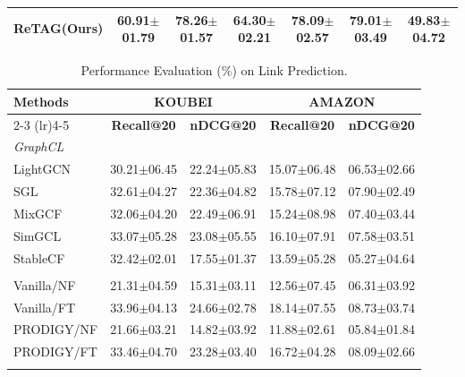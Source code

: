 \begin{table}[ht]
{\begin{tabular}{lcccccc}
\textbf{ReTAG(Ours)} & \textbf{60.91}$\pm$01.79  & \textbf{78.26}$\pm$01.57  & \textbf{64.30}$\pm$02.21  & 
\textbf{78.09}$\pm$02.57  & \textbf{79.01}$\pm$03.49  & \textbf{49.83}$\pm$04.72\\
\bottomrule
\end{tabular}
}

\label{tab:static-results}
\end{table}
\begin{table}[t]
\centering
\caption{Performance Evaluation (\%) on Link Prediction.}
\label{tab:dynamic-results}

\footnotesize
\setlength{\tabcolsep}{3.2pt}
\renewcommand{\arraystretch}{0.92}

\begin{tabular}{lcccc}
\toprule
\multirow{2}{*}{\textbf{Methods}}  
 & \multicolumn{2}{c}{\textbf{KOUBEI}} 
 & \multicolumn{2}{c}{\textbf{AMAZON}} \\
\cmidrule(lr){2-3} \cmidrule(lr){4-5}
 & \textbf{Recall@20} & \textbf{nDCG@20} 
 & \textbf{Recall@20} & \textbf{nDCG@20} \\
\midrule

\multicolumn{5}{l}{\textit{GraphCL}} \\
LightGCN  & 30.21$\pm$06.45 & 22.24$\pm$05.83 & 15.07$\pm$06.48 & 06.53$\pm$02.66 \\
SGL       & 32.61$\pm$04.27 & 22.36$\pm$04.82 & 15.78$\pm$07.12 & 07.90$\pm$02.49 \\
MixGCF    & 32.06$\pm$04.20 & 22.49$\pm$06.91 & 15.24$\pm$08.98 & 07.40$\pm$03.44 \\
SimGCL    & 33.07$\pm$05.28 & 23.08$\pm$05.55 & 16.10$\pm$07.91 & 07.58$\pm$03.51 \\
StableCF    & 32.42$\pm$02.01 & 17.55$\pm$01.37 & 13.59$\pm$05.28 & 05.27$\pm$04.64 \\
\addlinespace[0.3ex]
\midrule

\multicolumn{5}{l}{\textit{GraphPro+}} \\
Vanilla/NF   & 21.31$\pm$04.59 & 15.31$\pm$03.11 & 12.56$\pm$07.45 & 06.31$\pm$03.92 \\
Vanilla/FT   & 33.96$\pm$04.13 & 24.66$\pm$02.78 & 18.14$\pm$07.55 & 08.73$\pm$03.74 \\
PRODIGY/NF   & 21.66$\pm$03.21 & 14.82$\pm$03.92 & 11.88$\pm$02.61 & 05.84$\pm$01.84 \\
PRODIGY/FT   & 33.46$\pm$04.70 & 23.28$\pm$03.40 & 16.72$\pm$04.28 & 08.09$\pm$02.66 \\
\addlinespace[0.3ex]
\midrule


\end{tabular}
\end{table}

